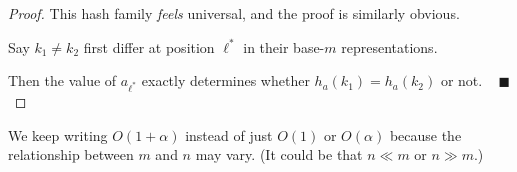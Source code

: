\begin{proof}
    This hash family \emph{feels} universal, and the proof is similarly obvious.
    
    Say $k_1 \neq k_2$ first differ at position $\ell^*$ in their base-$m$ representations.

    Then the value of $a_{\ell^*}$ exactly determines whether $h_a(k_1) = h_a(k_2)$ or not. ~ $\blacksquare$
\end{proof}

\begin{remark}
    We keep writing $O(1 + \alpha)$ instead of just $O(1)$ or $O(\alpha)$ because the relationship between $m$ and $n$ may vary.  (It could be that $n \ll m$ or $n \gg m$.)
\end{remark}

